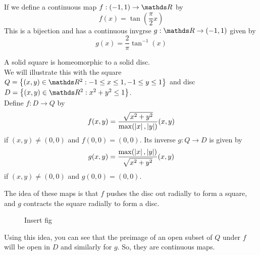 \documentclass[../main-sheet.tex]{subfiles}
\begin{document}
If we define a continuous map \(f:(-1,1)\to \R\) by \[f(x)=\tan(\frac{\pi}{2}x)\] This is a bijection and has a continuous invgrse     \(g:\R\to (-1,1)\) given by 
\[g(x)=\frac{2}{\pi}\tan^{-1}(x)\]
\begin{ex}
    A solid square is homeomorphic to a solid disc.\\
    We will illustrate this with the square \(Q=\set{(x,y)\in\R^2:-1\leq x\leq1,-1\leq y\leq1}\) and disc \(D=\set{(x,y)\in\R^2:x^2+y^2\leq 1}\).\\
    Define \(f:D\to Q\) by \[f(x,y)=\frac{\sqrt{x^2+y^2}}{\max(\left\vert x\right\vert,\left\vert y\right\vert)}(x,y)\]
    if \((x,y)\neq (0,0)\) and \(f(0,0)=(0,0)\). Its inverse \(g:Q\to D\) is given by \[g(x,y)=\frac{\max(\left\vert x\right\vert,\left\vert y\right\vert)}{\sqrt{x^2+y^2}}(x,y)\]
    if \((x,y)\neq (0,0)\) and \(g(0,0)=(0,0)\).
\end{ex}
The idea of these maps is that \(f\) pushes the disc out radially to form a square, and \(g\) contracts the square radially to form a disc.
\begin{figure}[ht]
    \centering
    Insert fig
\end{figure}
Using this idea, you can see that the preimage of an open subset of \(Q\) under \(f\) will be open in \(D\) and similarly for \(g\). So, they are continuous maps.
\end{document}
